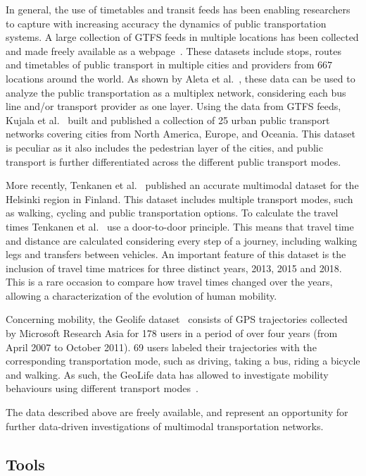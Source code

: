 In general, the use of timetables and transit feeds has been enabling researchers to capture with increasing accuracy the dynamics of public transportation systems. A large collection of GTFS feeds in multiple locations has been collected and made freely available as a webpage~\cite{transitfeeds}. These datasets include stops, routes and timetables of public transport in multiple cities and providers from $667$ locations around the world. As shown by Aleta et al.~\cite{Aleta2017Multilayer}, these data can be used to analyze the public transportation as a multiplex network, considering each bus line and/or transport provider as one layer. Using the data from GTFS feeds, Kujala et al.~\cite{kujala2018collection} built and published a collection of 25 urban public transport networks covering cities from North America, Europe, and Oceania. This dataset is peculiar as it also includes the pedestrian layer of the cities, and public transport is further differentiated across the different public transport modes. 

More recently, Tenkanen et al.~\cite{tenkanen2020travel} published an accurate multimodal dataset for the Helsinki region in Finland. This dataset includes multiple transport modes, such as walking, cycling and public transportation options. To calculate the travel times Tenkanen et al.~\cite{tenkanen2020travel} use a door-to-door principle. This means that travel time and distance are calculated considering every step of a journey, including walking legs and transfers between vehicles. An important feature of this dataset is the inclusion of travel time matrices for three distinct years, 2013, 2015 and 2018. This is a rare occasion to compare how travel times changed over the years, allowing a characterization of the evolution of human mobility.

Concerning mobility, the Geolife dataset~\cite{zheng2011geolife} consists of GPS trajectories collected by Microsoft Research Asia for 178 users in a period of over four years (from April 2007 to October 2011). 69 users labeled their trajectories with the corresponding transportation mode, such as driving, taking a bus, riding a bicycle and walking. As such, the GeoLife data has allowed to investigate mobility behaviours using different transport modes~\cite{zhao2015explaining}.

The data described above are freely available, and represent an opportunity for further data-driven investigations of multimodal transportation networks.

\subsection{Tools}

